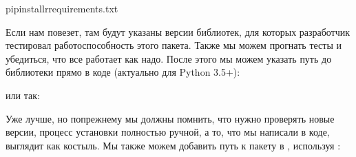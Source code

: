 \documentclass[letterpaper,10pt,russian]{sphinxmanual}
\begin{document}
\begin{sphinxVerbatim}[commandchars=\\\{\}]
pipinstall\PYGZhy{}rrequirements.txt
\end{sphinxVerbatim}

\sphinxAtStartPar
Если нам повезет, там будут указаны версии библиотек, для которых разработчик тестировал работоспособность этого пакета. Также мы можем прогнать тесты и убедиться, что все работает как надо. После этого мы можем указать путь до библиотеки прямо в коде (актуально для Python 3.5+):

\begin{sphinxVerbatim}[commandchars=\\\{\}]
    
 

   
  
\PYG{p}{[}\PYG{p}{]}  
\end{sphinxVerbatim}

\sphinxAtStartPar
или так:

\begin{sphinxVerbatim}[commandchars=\\\{\}]
 
 
\end{sphinxVerbatim}

\sphinxAtStartPar
Уже лучше, но по\sphinxhyphen{}прежнему мы должны помнить, что нужно проверять новые версии, процесс установки полностью ручной, а то, что мы написали в коде, выглядит как костыль. Мы также можем добавить путь к пакету в , используя :
\end{document}
